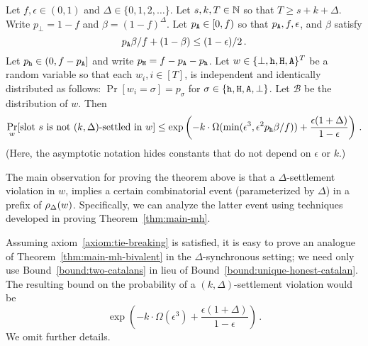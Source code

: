 

    \begin{theorem}\label{thm:main-mh-async}
      Let $f, \epsilon \in (0,1)$ and $\Delta \in \{0, 1, 2, \ldots\}$. 
      Let $s, k, T \in \mathbb{N}$ so that $T \geq s + k + \Delta$. 
      Write $p_\perp = 1 - f$ and $\beta = (1 - f)^\Delta$. 
      Let $p_{\mathtt{A}} \in [0, f)$ so that $p_{\mathtt{A}}, f, \epsilon$, and $\beta$ 
      satisfy 
      \begin{equation}\label{eq:condition-prob-delta}
        p_{\mathtt{A}}  \beta/f + (1 - \beta) \leq (1 - \epsilon)/2 
        \,.
      \end{equation}      
      Let $p_{\mathtt{h}} \in (0, f - p_{\mathtt{A}}]$ and write $p_{\mathtt{H}} = f - p_{\mathtt{A}} - p_{\mathtt{h}}$. 
      Let $w \in \{\perp, \mathtt{h}, \mathtt{H}, \mathtt{A}\}^T$ be a random variable 
      so that each 
      $w_i, i \in [T]$, is independent and identically distributed as
      follows: $\Pr[w_i = \sigma] = p_\sigma$ for
      $\sigma \in \{\mathtt{h}, \mathtt{H}, \mathtt{A}, \perp\}$. 
      Let $\mathcal{B}$ be the distribution of $w$. 
      Then 
      $$
        \Pr_w[\text{slot $s$ is not $(k, \Delta)$-settled in $w$}]  
          \leq
        \exp\left( 
          -k\cdot \Omega(\min(\epsilon^3, \epsilon^2 p_{\mathtt{h}} \beta/f ) ) 
          + 
          \frac{\epsilon(1+\Delta)}{1 - \epsilon} 
        \right)
        \,.
      $$
      (Here, the asymptotic notation hides constants that do not depend on $\epsilon$ or $k$.)
    \end{theorem}
    
  
    The main observation for proving the theorem above is that 
    a $\Delta$-settlement violation in $w$, 
    implies a certain combinatorial event (parameterized by $\Delta$) 
    in a prefix of $\rho_\Delta(w)$. 
    Specifically, we can analyze the latter event 
    using techniques developed in proving Theorem~\ref{thm:main-mh}. 

    Assuming axiom~\ref{axiom:tie-breaking} is satisfied, 
    it is easy to prove an analogue of Theorem~\ref{thm:main-mh-bivalent} 
    in the $\Delta$-synchronous setting; 
    we need only use Bound~\ref{bound:two-catalans} 
    in lieu of Bound~\ref{bound:unique-honest-catalan}. 
    The resulting bound on the probability of a $(k, \Delta)$-settlement violation would be 
    $$
      \exp\left( 
        -k\cdot \Omega(\epsilon^3) 
        + 
        \frac{\epsilon(1+\Delta)}{1 - \epsilon} 
      \right)
      \,.
    $$
    We omit further details.


